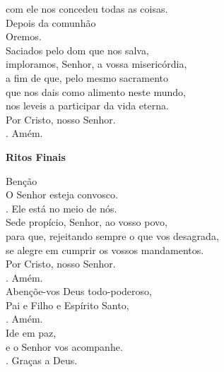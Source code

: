 \documentclass{book}
\begin{document}
\begin{flushleft}
    com ele nos concedeu todas as coisas.
    \vspace{.2cm} \\
    \textcolor{VioletRed2}{Depois da comunhão}
    \vspace{.2cm} \\
    Oremos.
    \vspace{.2cm} \\
    Saciados pelo dom que nos salva, \\
    imploramos, Senhor, a vossa misericórdia, \\
    a fim de que, pelo mesmo sacramento \\
    que nos dais como alimento neste mundo, \\
    nos leveis a participar da vida eterna. \\
    Por Cristo, nosso Senhor.
    \vspace{.2cm} \\
    {\color{VioletRed2} \Rbar.} Amém.
\end{flushleft}
\begin{center}
    \textbf{Ritos Finais}
\end{center}
\begin{flushleft}
    \textcolor{VioletRed2}{Benção}
    \vspace{.2cm} \\
    O Senhor esteja convosco.
    \vspace{.2cm} \\
    {\color{VioletRed2} \Rbar.} Ele está no meio de nós.
    \vspace{.2cm} \\
    Sede propício, Senhor, ao vosso povo, \\
    para que, rejeitando sempre o que vos desagrada, \\
    se alegre em cumprir os vossos mandamentos. \\
    Por Cristo, nosso Senhor. \\
    {\color{VioletRed2} \Rbar.} Amém.
    \vspace{.2cm} \\
    Abençõe-vos Deus todo-poderoso, \\
    Pai e Filho e Espírito Santo,
    \vspace{.2cm} \\
    {\color{VioletRed2} \Rbar.} Amém.
    \vspace{.2cm} \\
    Ide em paz, \\
    e o Senhor vos acompanhe.
    \vspace{.2cm} \\
    {\color{VioletRed2} \Rbar.} Graças a Deus.
\end{flushleft}
\end{document}
